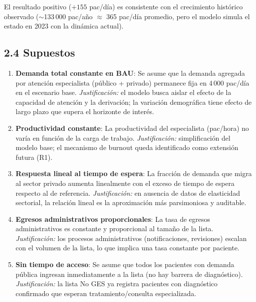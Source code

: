 \documentclass[12pt,a4paper]{article}
\begin{document}
El resultado positivo ($+155$ pac/día) es consistente con el crecimiento histórico observado ($\sim$133\,000 pac/año $\approx$ 365 pac/día promedio, pero el modelo simula el estado en 2023 con la dinámica actual).

\subsection{2.4 Supuestos}

\begin{enumerate}[leftmargin=1.5cm,label=\textbf{S\arabic*.}]
  \item \textbf{Demanda total constante en BAU}: Se asume que la demanda agregada por atención especialista (público + privado) permanece fija en 4\,000 pac/día en el escenario base. \textit{Justificación:} el modelo busca aislar el efecto de la capacidad de atención y la derivación; la variación demográfica tiene efecto de largo plazo que supera el horizonte de interés.

  \item \textbf{Productividad constante}: La productividad del especialista (pac/hora) no varía en función de la carga de trabajo. \textit{Justificación:} simplificación del modelo base; el mecanismo de burnout queda identificado como extensión futura (R1).

  \item \textbf{Respuesta lineal al tiempo de espera}: La fracción de demanda que migra al sector privado aumenta linealmente con el exceso de tiempo de espera respecto al de referencia. \textit{Justificación:} en ausencia de datos de elasticidad sectorial, la relación lineal es la aproximación más parsimoniosa y auditable.

  \item \textbf{Egresos administrativos proporcionales}: La tasa de egresos administrativos es constante y proporcional al tamaño de la lista. \textit{Justificación:} los procesos administrativos (notificaciones, revisiones) escalan con el volumen de la lista, lo que implica una tasa constante por paciente.

  \item \textbf{Sin tiempo de acceso}: Se asume que todos los pacientes con demanda pública ingresan inmediatamente a la lista (no hay barrera de diagnóstico). \textit{Justificación:} la lista No GES ya registra pacientes con diagnóstico confirmado que esperan tratamiento/consulta especializada.
\end{enumerate}
\end{document}
